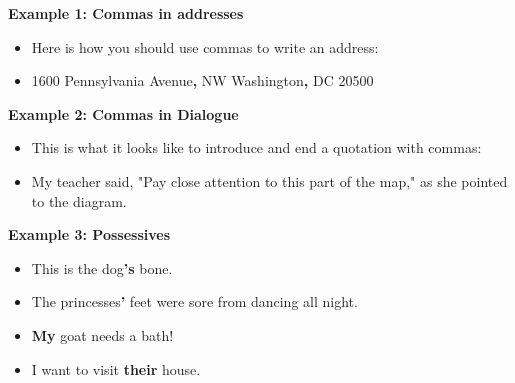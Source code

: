 \documentclass[12pt]{article}
\begin{document}
\vspace{1em}

\begin{tcolorbox}[colframe=black!60, colback=white, 
coltitle=black, colbacktitle=black!15, fonttitle=\bfseries\Large, 
title=Examples, halign title=center, left=10pt, right=10pt, top=10pt, bottom=15pt]
\textbf{Example 1: Commas in addresses}
\begin{itemize}
    \item Here is how you should use commas to write an address:
\item 1600 Pennsylvania Avenue\textbf{,} NW Washington\textbf{,} DC 20500

\end{itemize}

\textbf{Example 2: Commas in Dialogue}
\begin{itemize}
    \item This is what it looks like to introduce and end a quotation with commas:
    \item My teacher said, "Pay close attention to this part of the map," as she pointed to the diagram.

\end{itemize}
\textbf{Example 3: Possessives}
\begin{itemize}
    \item This is the dog\textbf{'s} bone.
    \item The princesses\textbf{'} feet were sore from dancing all night.
    \item \textbf{My} goat needs a bath!
    \item I want to visit \textbf{their} house.

\end{itemize}

     \end{tcolorbox}

\vspace{1em}
\end{document}
